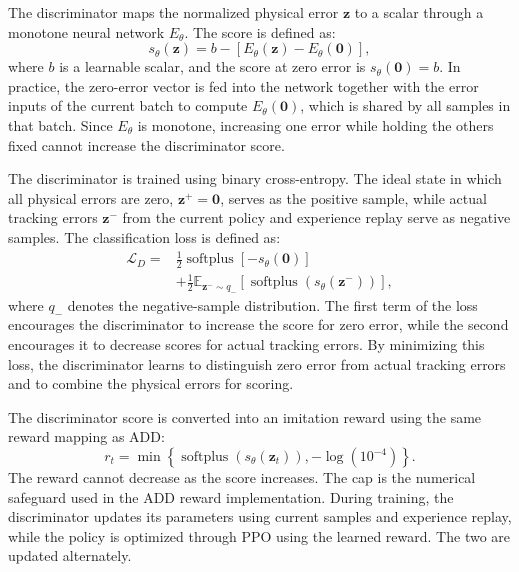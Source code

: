 \documentclass[letterpaper, 10pt, conference]{ieeeconf}
\begin{document}
The discriminator maps the normalized physical error $\mathbf z$ to a
scalar through a monotone neural network $E_\theta$. The score is defined
as:
\begin{equation}
s_\theta(\mathbf z)
=b-\left[E_\theta(\mathbf z)-E_\theta(\mathbf 0)\right],
\label{eq:mira_score}
\end{equation}
where $b$ is a learnable scalar, and the score at zero error is
$s_\theta(\mathbf 0)=b$. In practice, the zero-error vector is fed into
the network together with the error inputs of the current batch to
compute $E_\theta(\mathbf 0)$, which is shared by all samples in that
batch. Since $E_\theta$ is monotone, increasing one error while
holding the others fixed cannot increase the discriminator score.

The discriminator is trained using binary cross-entropy. The ideal state
in which all physical errors are zero, $\mathbf z^+=\mathbf 0$, serves
as the positive sample, while actual tracking errors $\mathbf z^-$ from
the current policy and experience replay serve as negative samples. The
classification loss is defined as:
\begin{equation}
\begin{aligned}
\mathcal L_D ={}&
\frac12\operatorname{softplus}
\left[-s_\theta(\mathbf 0)\right] \\
&+\frac12\mathbb E_{\mathbf z^-\sim q_{-}}
\left[\operatorname{softplus}
\left(s_\theta(\mathbf z^-)\right)\right],
\end{aligned}
\label{eq:mira_loss}
\end{equation}
where $q_{-}$ denotes the negative-sample distribution. The first term of
the loss encourages the discriminator to increase the score for zero
error, while the second encourages it to decrease scores for actual
tracking errors. By minimizing this loss, the discriminator learns to
distinguish zero error from actual tracking errors and to combine the
physical errors for scoring.

The discriminator score is converted into an imitation reward using the
same reward mapping as ADD:
\begin{equation}
r_t=\min\left\{\operatorname{softplus}\left(s_\theta(\mathbf z_t)\right),
              -\log(10^{-4})\right\}.
\label{eq:reward}
\end{equation}
The reward cannot decrease as the score increases. The cap is the
numerical safeguard used in the ADD reward implementation. During training, the
discriminator updates its parameters using current samples and experience
replay, while the policy is optimized through PPO using the learned
reward. The two are updated alternately.
\end{document}
